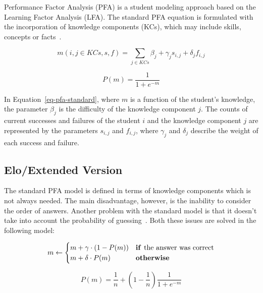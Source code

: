 Performance Factor Analysis (PFA) is a student modeling approach based on the Learning Factor Analysis (LFA). The standard PFA equation is formulated with the incorporation of knowledge components (KCs), which may include skills, concepts or facts~\cite{Pavlik2009}.

\begin{equation} \label{eq-pfa-standard}
  m(i,j \in KCs,s,f) = \sum_{j \in KCs} \beta_j + \gamma_j s_{i,j} + \delta_j f_{i,j} 
\end{equation}

\begin{equation} \label{eq-pfa-standard-p}
  P(m) = \frac{1}{1 + e^{-m}}
\end{equation}

In Equation~\ref{eq-pfa-standard}, where $m$ is a function of the student's knowledge, the parameter $\beta_j$ is the difficulty of the knowledge component $j$. The counts of current successes and failures of the student $i$ and the knowledge component $j$ are represented by the parameters $s_{i,j}$ and $f_{i,j}$, where $\gamma_j$ and $\delta_j$ describe the weight of each success and failure.

\subsection*{Elo/Extended Version}
\label{pfae}

The standard PFA model is defined in terms of knowledge components which is not always needed. The main disadvantage, however, is the inability to consider the order of answers. Another problem with the standard model is that it doesn't take into account the probability of guessing~\cite{Papousek2014}. Both these issues are solved in the following model:

\begin{equation} \label{eq-pfa-extended}
  m \gets \begin{cases}
            m + \gamma \cdot (1 - P(m)) & \text{\textbf{if }} \text{the answer was correct} \\
            m + \delta \cdot P(m) & \text{\textbf{otherwise}}
          \end{cases}
\end{equation}

\begin{equation} \label{eq-pfa-standard-p}
  P(m) = \frac{1}{n} + \left(1 - \frac{1}{n}\right)\frac{1}{1 + e^{-m}}
\end{equation}

